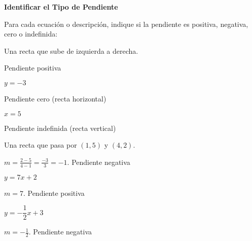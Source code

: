 \begin{exercise}
\textbf{Identificar el Tipo de Pendiente}

Para cada ecuación o descripción, indique si la pendiente es positiva, negativa, cero o indefinida:

\problem Una recta que sube de izquierda a derecha.

\begin{solucion}
Pendiente positiva
\end{solucion}

\problem $y = -3$

\begin{solucion}
Pendiente cero (recta horizontal)
\end{solucion}

\problem $x = 5$

\begin{solucion}
Pendiente indefinida (recta vertical)
\end{solucion}

\problem Una recta que pasa por $(1, 5)$ y $(4, 2)$.

\begin{solucion}
$m = \frac{2-5}{4-1} = \frac{-3}{3} = -1$. Pendiente negativa
\end{solucion}

\problem $y = 7x + 2$

\begin{solucion}
$m = 7$. Pendiente positiva
\end{solucion}

\problem $y = -\dfrac{1}{2}x + 3$

\begin{solucion}
$m = -\frac{1}{2}$. Pendiente negativa
\end{solucion}
\end{exercise}

